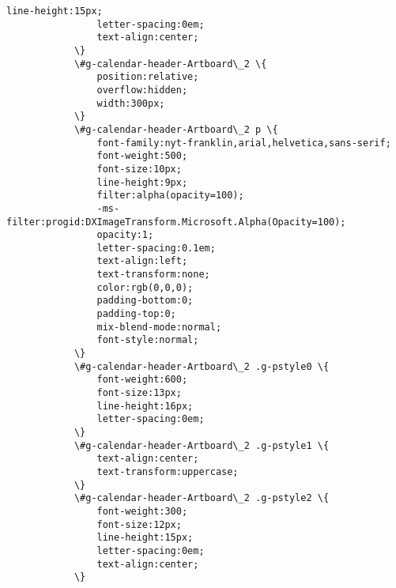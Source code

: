 \documentclass[11pt]{article}
\begin{document}
\begin{Verbatim}[commandchars=\\\{\}]
         		line-height:15px;
         		letter-spacing:0em;
         		text-align:center;
         	\}
         	\#g-calendar-header-Artboard\_2 \{
         		position:relative;
         		overflow:hidden;
         		width:300px;
         	\}
         	\#g-calendar-header-Artboard\_2 p \{
         		font-family:nyt-franklin,arial,helvetica,sans-serif;
         		font-weight:500;
         		font-size:10px;
         		line-height:9px;
         		filter:alpha(opacity=100);
         		-ms-filter:progid:DXImageTransform.Microsoft.Alpha(Opacity=100);
         		opacity:1;
         		letter-spacing:0.1em;
         		text-align:left;
         		text-transform:none;
         		color:rgb(0,0,0);
         		padding-bottom:0;
         		padding-top:0;
         		mix-blend-mode:normal;
         		font-style:normal;
         	\}
         	\#g-calendar-header-Artboard\_2 .g-pstyle0 \{
         		font-weight:600;
         		font-size:13px;
         		line-height:16px;
         		letter-spacing:0em;
         	\}
         	\#g-calendar-header-Artboard\_2 .g-pstyle1 \{
         		text-align:center;
         		text-transform:uppercase;
         	\}
         	\#g-calendar-header-Artboard\_2 .g-pstyle2 \{
         		font-weight:300;
         		font-size:12px;
         		line-height:15px;
         		letter-spacing:0em;
         		text-align:center;
         	\}
         

\end{Verbatim}
\end{document}
